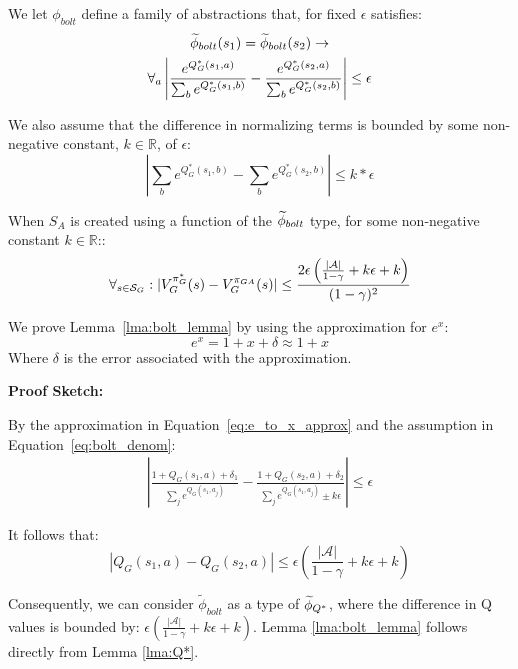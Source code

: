 We let $\phi_{bolt}$ define a family of abstractions that, for fixed $\epsilon$ satisfies:
\begin{multline}
\widetilde \phi_{bolt}(s_1) = \widetilde \phi_{bolt}(s_2) \rightarrow \\
\forall_{a} \left|\frac{e^{Q_G^*(s_1,a)}}{\sum_b e^{Q_G^*(s_1,b)}} - \frac{e^{Q_G^*(s_2,a)}}{\sum_b e^{Q_G^*(s_2,b)}}\right| \leq \epsilon
\label{eq:phi_bolt}
\end{multline}
\edefn

We also assume that the difference in normalizing terms is bounded by some non-negative constant, $k\in \mathbb{R}$, of $\epsilon$:
\begin{equation}
\left| \sum_b e^{Q_G^*(s_1,b)} - \sum_b e^{Q_G^*(s_2,b)} \right| \leq k*\epsilon
\label{eq:bolt_denom}
\end{equation}

\begin{lma} When $S_A$ is created using a function of the $\widetilde \phi_{bolt}$ type, for some non-negative constant $k \in \mathbb{R}$::
\begin{equation}
\forall_{s \in \mathcal{S}_G} : | V_G^{\pi^*_G}(s) - V_G^{\pi_{GA}}(s) | \leq \frac{2\epsilon\left(\frac{|\mathcal{A}|}{1-\gamma} + k\epsilon + k\right)}{(1-\gamma)^2}
\end{equation}
\label{lma:bolt_lemma}
\end{lma}

We prove Lemma~\ref{lma:bolt_lemma} by using the approximation for $e^x$:
\begin{equation}
 e^x = 1 + x + \delta  \approx 1 + x
\label{eq:e_to_x_approx}
\end{equation}
Where $\delta$ is the error associated with the approximation.

{\bf Proof Sketch:}

By the approximation in Equation~\ref{eq:e_to_x_approx} and the assumption in Equation~\ref{eq:bolt_denom}:
\begin{align*}
|\frac{1 + Q_G(s_1,a) + \delta_1}{\sum_j e^{Q_G(s_1,a_j)}} - \frac{1 + Q_G(s_2,a) + \delta_2}{\sum_j e^{Q_G(s_1,a_j)} \pm k\epsilon}| \leq \epsilon
\end{align*}

It follows that:
\begin{equation}
|Q_G(s_1,a) - Q_G(s_2,a)| \leq \epsilon \left(\frac{|\mathcal{A}|}{1-\gamma} + k\epsilon + k \right)
\label{eq:bolt_qs}
\end{equation}

Consequently, we can consider $\widetilde{\phi}_{bolt}$ as a type of $\widetilde \phi_{Q^*}$, where the difference in Q values is bounded by: $\epsilon \left(\frac{|\mathcal{A}|}{1-\gamma} + k\epsilon + k \right)$. Lemma \ref{lma:bolt_lemma} follows directly from Lemma \ref{lma:Q*}.


